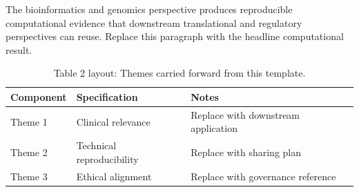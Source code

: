 
The bioinformatics and genomics perspective produces reproducible computational evidence that downstream translational and regulatory perspectives can reuse. Replace this paragraph with the headline computational result.

\begin{table}[H]
\caption{Table 2 layout: Themes carried forward from this template.}
\label{tab:conclusions_themes}
\centering
\begin{tabular}{>{\raggedright\arraybackslash}p{3.4cm} >{\raggedright\arraybackslash}p{4.6cm} >{\raggedright\arraybackslash}p{5.4cm}}
\toprule
\textbf{Component} & \textbf{Specification} & \textbf{Notes} \\
\midrule
  Theme 1 & Clinical relevance & Replace with downstream application \\
  Theme 2 & Technical reproducibility & Replace with sharing plan \\
  Theme 3 & Ethical alignment & Replace with governance reference \\
\bottomrule
\end{tabular}
\end{table}
